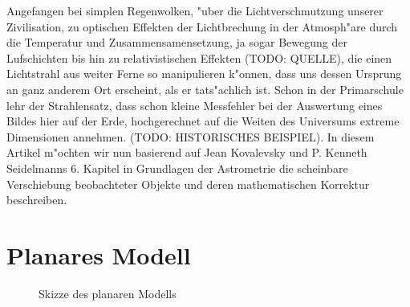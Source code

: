 Angefangen bei simplen Regenwolken, "uber die Lichtverschmutzung unserer Zivilisation, zu optischen Effekten der Lichtbrechung in der Atmosph"are durch die Temperatur und Zusammensamensetzung, ja sogar Bewegung der Lufschichten bis hin zu relativistischen Effekten (TODO: QUELLE), die einen Lichtstrahl aus weiter Ferne so manipulieren k"onnen, dass uns dessen Ursprung an ganz anderem Ort erscheint, als er tats"achlich ist. 
Schon in der Primarschule lehr der Strahlensatz, dass schon kleine Messfehler bei der Auswertung eines Bildes hier auf der Erde, hochgerechnet auf die Weiten des Universums extreme Dimensionen annehmen. (TODO: HISTORISCHES BEISPIEL). 
In diesem Artikel m"ochten wir nun basierend auf Jean Kovalevsky und P. Kenneth Seidelmanns 6. Kapitel in Grundlagen der Astrometrie \cite{licht:astrometry} die scheinbare Verschiebung beobachteter Objekte und deren mathematischen Korrektur beschreiben. 

\section{Planares Modell}
\begin{figure}
\centering
{}
\caption{Skizze des planaren Modells}
\label{fig:13_1}
\end{figure}


